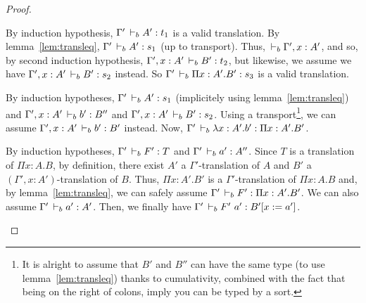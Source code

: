 \documentclass[a4paper,english]{lipics-utf8x}
\begin{document}
\begin{proof}
\begin{caselist}
      \begin{graycase}
        \begin{mathc}
        \end{mathc}
        By induction hypothesis, $\Gamma' \,\vdash_b A' : t_1$ is a valid
        translation.
        By lemma~\ref{lem:transleq}, $\Gamma' \,\vdash_b A' : s_1$ (up to transport).
        Thus, $\,\vdash_b \Gamma', x : A'$, and so, by second induction hypothesis,
        $\Gamma', x:A' \,\vdash_b B' : t_2$, but likewise, we assume we have
        $\Gamma', x:A' \,\vdash_b B' : s_2$ instead.
        So $\Gamma' \,\vdash_b \Pi x:A'.B' : s_3$ is a valid translation.
      \end{graycase}

      \begin{graycase}
        \begin{mathc}
        \end{mathc}
        By induction hypotheses, $\Gamma' \,\vdash_b A' : s_1$ (implicitely using
        lemma~\ref{lem:transleq}) and $\Gamma', x:A' \,\vdash_b b' : B''$ and
        $\Gamma', x:A' \,\vdash_b B' : s_2$.
        Using a transport\footnote{It is alright to assume that $B'$ and $B''$
        can have the same type (to use lemma~\ref{lem:transleq})
        thanks to cumulativity, combined with the fact that being on the right
        of colons, imply you can be typed by a sort.},
        we can assume $\Gamma', x:A' \,\vdash_b b' : B'$ instead.
        Now, $\Gamma' \,\vdash_b \lambda x:A'.b' : \Pi x:A'.B'$.
      \end{graycase}

      \nextcase
      \begin{mathc}
      \end{mathc}
      By induction hypotheses, $\Gamma' \,\vdash_b F' : T$ and
      $\Gamma' \,\vdash_b a' : A''$.
      Since $T$ is a translation of $\Pi x:A.B$, by definition, there exist
      $A'$ a $\Gamma'$-translation of $A$ and
      $B'$ a $(\Gamma', x:A')$-translation of $B$.
      Thus, $\Pi x:A'.B'$ is a $\Gamma'$-translation of $\Pi x:A.B$ and, by
      lemma~\ref{lem:transleq}, we can safely assume
      $\Gamma' \,\vdash_b F' : \Pi x:A'.B'$. We can also assume
      $\Gamma' \,\vdash_b a' : A'$.
      Then, we finally have $\Gamma' \,\vdash_b F'\ a' : B'[x := a']$.


\end{caselist}
\end{proof}
\end{document}
